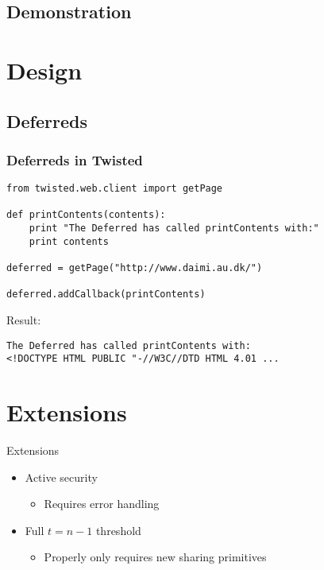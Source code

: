\documentclass[t,noamsthm]{beamer}
\begin{document}
\subsection{Demonstration}




\section{Design}

\subsection{Deferreds}

\begin{frame}[fragile]

\frametitle{Deferreds in Twisted}

\begin{lstlisting}
from twisted.web.client import getPage

def printContents(contents):
    print "The Deferred has called printContents with:"
    print contents

deferred = getPage("http://www.daimi.au.dk/")

deferred.addCallback(printContents)
\end{lstlisting}

Result:
\begin{lstlisting}[language={}]
The Deferred has called printContents with:
<!DOCTYPE HTML PUBLIC "-//W3C//DTD HTML 4.01 ...
\end{lstlisting}

\end{frame}


\section{Extensions}

\begin{frame}{Extensions}

  \begin{itemize}

  \item Active security
    \begin{itemize}
    \item Requires error handling
    \end{itemize}

  \item Full $t = n-1$ threshold
    \begin{itemize}
    \item Properly only requires new sharing primitives
    \end{itemize}

  \end{itemize}

\end{frame}
\end{document}
